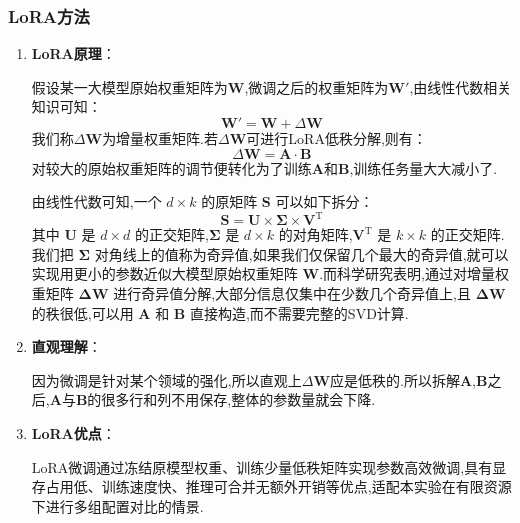 \documentclass[12pt]{ctexart}
\begin{document}
\subsubsection{LoRA方法}

\begin{enumerate}

    \item \textbf{LoRA原理}：

          假设某一大模型原始权重矩阵为\(\boldsymbol{W}\),微调之后的权重矩阵为\(\boldsymbol{W}'\),由线性代数相关知识可知：
          \[
              \boldsymbol{W}' = \boldsymbol{W} + \Delta\boldsymbol{W}
          \]
          我们称\(\Delta\boldsymbol{W}\)为增量权重矩阵.若\(\Delta\boldsymbol{W}\)可进行LoRA低秩分解,则有：
          \[
              \Delta\boldsymbol{W} = \boldsymbol{A}\cdot\boldsymbol{B}
          \]
          对较大的原始权重矩阵的调节便转化为了训练\(\boldsymbol{A}\)和\(\boldsymbol{B}\),训练任务量大大减小了.

          由线性代数可知,一个 \(d \times k\) 的原矩阵 \(\boldsymbol{S}\) 可以如下拆分：
          \[
              \boldsymbol{S} = \boldsymbol{U} \times \boldsymbol{\Sigma} \times \boldsymbol{V}^\mathrm{T}
          \]
          其中 \(\boldsymbol{U}\) 是 \(d \times d\) 的正交矩阵,\(\boldsymbol{\Sigma}\) 是 \(d \times k\) 的对角矩阵,\(\boldsymbol{V}^\mathrm{T}\) 是 \(k \times k\) 的正交矩阵.我们把 \(\boldsymbol{\Sigma}\) 对角线上的值称为奇异值,如果我们仅保留几个最大的奇异值,就可以实现用更小的参数近似大模型原始权重矩阵 \(\boldsymbol{W}\).而科学研究表明,通过对增量权重矩阵 \(\boldsymbol{\Delta W}\) 进行奇异值分解,大部分信息仅集中在少数几个奇异值上,且 \(\boldsymbol{\Delta W}\) 的秩很低,可以用 \(\boldsymbol{A}\) 和 \(\boldsymbol{B}\) 直接构造,而不需要完整的SVD计算.

    \item \textbf{直观理解}：

          因为微调是针对某个领域的强化,所以直观上\(\Delta\boldsymbol{W}\)应是低秩的.所以拆解\(\boldsymbol{A}\),\(\boldsymbol{B}\)之后,\(\boldsymbol{A}\)与\(\boldsymbol{B}\)的很多行和列不用保存,整体的参数量就会下降.

    \item \textbf{LoRA优点}：

          LoRA微调通过冻结原模型权重、训练少量低秩矩阵实现参数高效微调,具有显存占用低、训练速度快、推理可合并无额外开销等优点,适配本实验在有限资源下进行多组配置对比的情景.

\end{enumerate}
\end{document}
